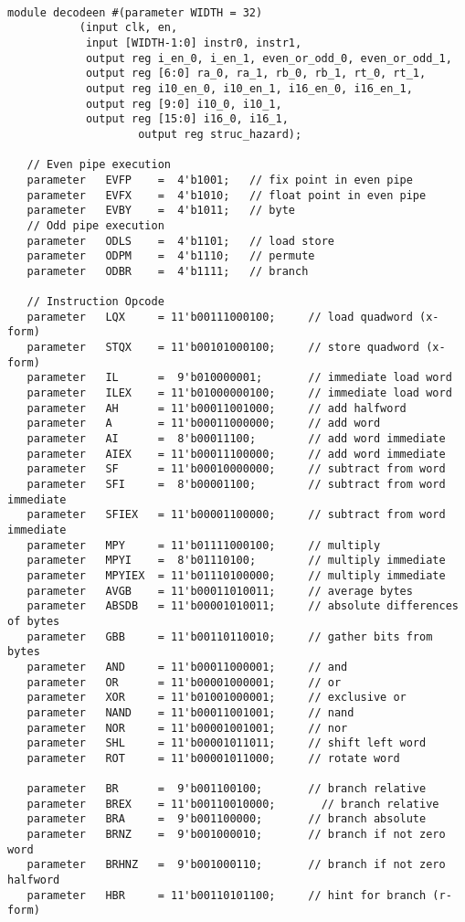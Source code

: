 \documentclass[preprint,authoryear,12pt]{elsarticle}
\begin{document}
\begin{verbatim}

module decodeen #(parameter WIDTH = 32)
		   (input clk, en,
		    input [WIDTH-1:0] instr0, instr1,
		    output reg i_en_0, i_en_1, even_or_odd_0, even_or_odd_1,
		    output reg [6:0] ra_0, ra_1, rb_0, rb_1, rt_0, rt_1,
		    output reg i10_en_0, i10_en_1, i16_en_0, i16_en_1,
		    output reg [9:0] i10_0, i10_1,
		    output reg [15:0] i16_0, i16_1,
                    output reg struc_hazard);

   // Even pipe execution
   parameter   EVFP    =  4'b1001;   // fix point in even pipe
   parameter   EVFX    =  4'b1010;   // float point in even pipe
   parameter   EVBY    =  4'b1011;   // byte
   // Odd pipe execution
   parameter   ODLS    =  4'b1101;   // load store
   parameter   ODPM    =  4'b1110;   // permute
   parameter   ODBR    =  4'b1111;   // branch
   
   // Instruction Opcode
   parameter   LQX     = 11'b00111000100;     // load quadword (x-form)
   parameter   STQX    = 11'b00101000100;     // store quadword (x-form)
   parameter   IL      =  9'b010000001;       // immediate load word
   parameter   ILEX    = 11'b01000000100;     // immediate load word
   parameter   AH      = 11'b00011001000;     // add halfword
   parameter   A       = 11'b00011000000;     // add word
   parameter   AI      =  8'b00011100;        // add word immediate
   parameter   AIEX    = 11'b00011100000;     // add word immediate
   parameter   SF      = 11'b00010000000;     // subtract from word
   parameter   SFI     =  8'b00001100;        // subtract from word immediate
   parameter   SFIEX   = 11'b00001100000;     // subtract from word immediate
   parameter   MPY     = 11'b01111000100;     // multiply
   parameter   MPYI    =  8'b01110100;        // multiply immediate
   parameter   MPYIEX  = 11'b01110100000;     // multiply immediate
   parameter   AVGB    = 11'b00011010011;     // average bytes
   parameter   ABSDB   = 11'b00001010011;     // absolute differences of bytes
   parameter   GBB     = 11'b00110110010;     // gather bits from bytes
   parameter   AND     = 11'b00011000001;     // and
   parameter   OR      = 11'b00001000001;     // or
   parameter   XOR     = 11'b01001000001;     // exclusive or
   parameter   NAND    = 11'b00011001001;     // nand
   parameter   NOR     = 11'b00001001001;     // nor
   parameter   SHL     = 11'b00001011011;     // shift left word
   parameter   ROT     = 11'b00001011000;     // rotate word

   parameter   BR      =  9'b001100100;       // branch relative
   parameter   BREX    = 11'b00110010000;       // branch relative
   parameter   BRA     =  9'b001100000;       // branch absolute
   parameter   BRNZ    =  9'b001000010;       // branch if not zero word
   parameter   BRHNZ   =  9'b001000110;       // branch if not zero halfword
   parameter   HBR     = 11'b00110101100;     // hint for branch (r-form)


\end{verbatim}
\end{document}

